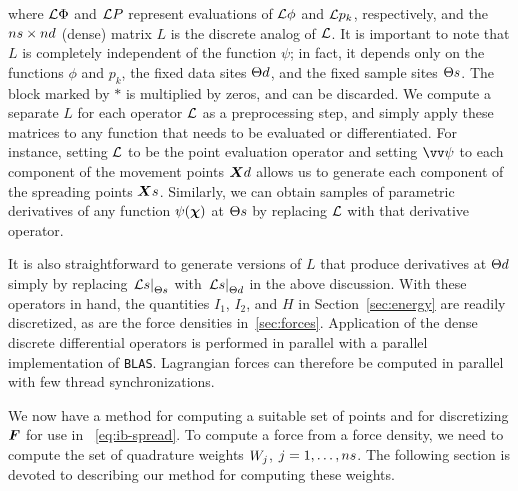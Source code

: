 where $\mathcal{L}\Phi$ and $\mathcal{L} P$ represent evaluations of $\mathcal{L}\phi$ and $\mathcal{L} p_k$, respectively, and the
$\sample\cardinality \times \data\cardinality$ (dense) matrix $L$ is the discrete analog of $\mathcal{L}$. It is important
to note that $L$ is completely independent of the function $\psi$; in fact, it depends only on the functions
$\phi$ and $p_k$, the fixed data sites $\data\sites$, and the fixed sample sites $\sample\sites$. The block marked
by $\ast$ is multiplied by zeros, and can be discarded. We compute a separate $L$ for each operator $\mathcal{L}$ as a
preprocessing step, and simply apply these matrices to any function that needs to be evaluated or differentiated.
For instance, setting $\mathcal{L}$ to be the point evaluation operator and setting $\arr{\psi}$ to each component of the
movement points $\data\X$ allows us to generate each component of the spreading points $\sample\X$.  Similarly, we
can obtain samples of parametric derivatives of any function $\psi(\boldsymbol{\chi})$ at $\sample\sites$ by replacing $\mathcal{L}$ with
that derivative operator.

It is also straightforward to generate versions of $L$ that produce derivatives at $\data\sites$ simply by
replacing $\left.\L s\right|_{\sample\sites}$ with $\left.\L s\right|_{\data\sites}$ in the above discussion. With
these operators in hand, the quantities $I_1$, $I_2$, and $H$ in Section~\ref{sec:energy} are readily discretized,
as are the force densities in~\ref{sec:forces}. Application of the dense discrete differential operators is
performed in parallel with a parallel implementation of \texttt{BLAS}. Lagrangian forces can therefore be computed
in parallel with few thread synchronizations.

We now have a method for computing a suitable set of points and for discretizing $\boldsymbol{F}$ for use in~%
\eqref{eq:ib-spread}. To compute a force from a force density, we need to compute the set of quadrature weights
$\weight[j]$, $j=1,\ldots,\sample\cardinality$. The following section is devoted to describing our method for
computing these weights.
